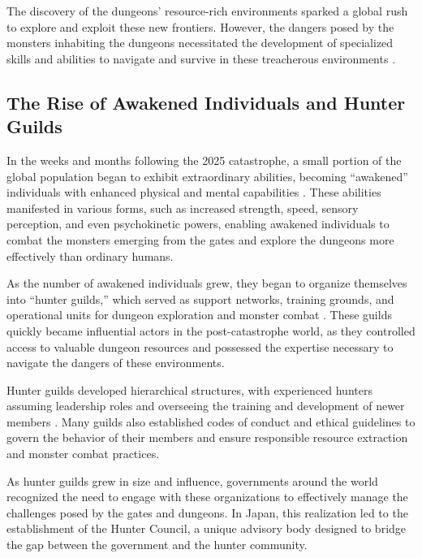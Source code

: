 \documentclass[12pt, a4paper]{article}
\begin{document}
The discovery of the dungeons' resource-rich environments sparked a global rush to explore and exploit these new frontiers. However, the dangers posed by the monsters inhabiting the dungeons necessitated the development of specialized skills and abilities to navigate and survive in these treacherous environments \citep{santos2027behavioral, kowalczyk2026application}.

\subsection{The Rise of Awakened Individuals and Hunter Guilds}

In the weeks and months following the 2025 catastrophe, a small portion of the global population began to exhibit extraordinary abilities, becoming ``awakened'' individuals with enhanced physical and mental capabilities \citep{novikova2027morphological, lee2027psychological}. These abilities manifested in various forms, such as increased strength, speed, sensory perception, and even psychokinetic powers, enabling awakened individuals to combat the monsters emerging from the gates and explore the dungeons more effectively than ordinary humans.

As the number of awakened individuals grew, they began to organize themselves into ``hunter guilds,'' which served as support networks, training grounds, and operational units for dungeon exploration and monster combat \citep{nakano2026rise, sokolov2026rituals}. These guilds quickly became influential actors in the post-catastrophe world, as they controlled access to valuable dungeon resources and possessed the expertise necessary to navigate the dangers of these environments.

Hunter guilds developed hierarchical structures, with experienced hunters assuming leadership roles and overseeing the training and development of newer members \citep{nakano2026rise}. Many guilds also established codes of conduct and ethical guidelines to govern the behavior of their members and ensure responsible resource extraction and monster combat practices.

As hunter guilds grew in size and influence, governments around the world recognized the need to engage with these organizations to effectively manage the challenges posed by the gates and dungeons. In Japan, this realization led to the establishment of the Hunter Council, a unique advisory body designed to bridge the gap between the government and the hunter community.
\end{document}
